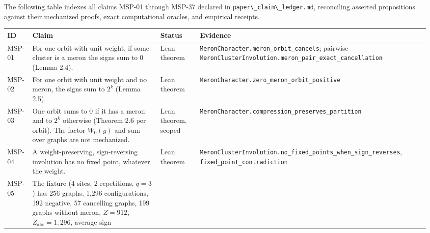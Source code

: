 \documentclass[
  11pt,
]{article}
\newcommand{\passthrough}[1]{#1}
\begin{document}
The following table indexes all claims MSP-01 through MSP-37 declared in
\passthrough{\lstinline!paper\_claim\_ledger.md!}, reconciling asserted
propositions against their mechanized proofs, exact computational
oracles, and empirical receipts.

\begin{longtable}[]{@{}
  >{\raggedright\arraybackslash}p{}
  >{\raggedright\arraybackslash}p{}
  >{\raggedright\arraybackslash}p{}
  >{\raggedright\arraybackslash}p{}@{}}
\toprule\noalign{}
\begin{minipage}[b]{\linewidth}\raggedright
ID
\end{minipage} & \begin{minipage}[b]{\linewidth}\raggedright
Claim
\end{minipage} & \begin{minipage}[b]{\linewidth}\raggedright
Status
\end{minipage} & \begin{minipage}[b]{\linewidth}\raggedright
Evidence
\end{minipage} \\
\midrule\noalign{}
\endhead
\bottomrule\noalign{}
\endlastfoot
MSP-01 & For one orbit with unit weight, if some cluster is a meron the
signs sum to 0 (Lemma 2.4). & Lean theorem &
\nolinkurl{MeronCharacter.meron_orbit_cancels}; pairwise
\nolinkurl{MeronClusterInvolution.meron_pair_exact_cancellation} \\
MSP-02 & For one orbit with unit weight and no meron, the signs sum to
\(2^k\) (Lemma 2.5). & Lean theorem &
\nolinkurl{MeronCharacter.zero_meron_orbit_positive} \\
MSP-03 & One orbit sums to 0 if it has a meron and to \(2^k\) otherwise
(Theorem 2.6 per orbit). The factor \(W_0(g)\) and sum over graphs are
not mechanized. & Lean theorem, scoped &
\nolinkurl{MeronCharacter.compression_preserves_partition} \\
MSP-04 & A weight-preserving, sign-reversing involution has no fixed
point, whatever the weight. & Lean theorem &
\nolinkurl{MeronClusterInvolution.no_fixed_points_when_sign_reverses},
\nolinkurl{fixed_point_contradiction} \\
MSP-05 & The fixture (4 sites, 2 repetitions, \(q=3\)) has 256 graphs,
1,296 configurations, 192 negative, 57 cancelling graphs, 199 graphs
without meron, \(Z=912\), \(Z_{\mathrm{abs}}=1,296\), average sign

\end{longtable}
\end{document}
